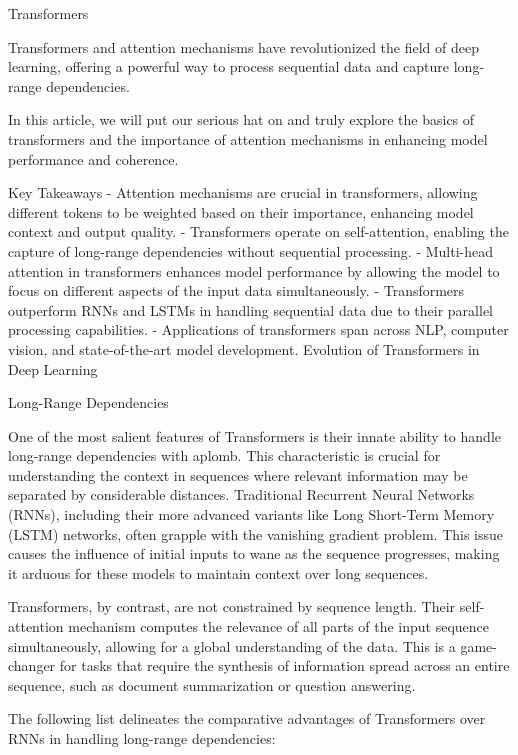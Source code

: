 \documentclass[10pt]{beamer}
\begin{document}
\begin{frame}[fragile]{Transformers}

	Transformers and attention mechanisms have revolutionized the field of deep learning, offering a powerful way to
	process sequential data and capture long-range dependencies.

	In this article, we will put our serious hat on and truly explore the basics of transformers and the importance of
	attention mechanisms in enhancing model performance and coherence.

	Key Takeaways
	- Attention mechanisms are crucial in transformers, allowing different tokens to be weighted based on their
	importance, enhancing model context and output quality.
	- Transformers operate on self-attention, enabling the capture of long-range dependencies without sequential
	processing.
	- Multi-head attention in transformers enhances model performance by allowing the model to focus on different
	aspects of the input data simultaneously.
	- Transformers outperform RNNs and LSTMs in handling sequential data due to their parallel processing
	capabilities.
	- Applications of transformers span across NLP, computer vision, and state-of-the-art model development.
	Evolution of Transformers in Deep Learning

	Long-Range Dependencies

	One of the most salient features of Transformers is their innate ability to handle long-range dependencies with
	aplomb. This characteristic is crucial for understanding the context in sequences where relevant information may be
	separated by considerable distances. Traditional Recurrent Neural Networks (RNNs), including their more advanced
	variants like Long Short-Term Memory (LSTM) networks, often grapple with the vanishing gradient problem. This issue
	causes the influence of initial inputs to wane as the sequence progresses, making it arduous for these models to
	maintain context over long sequences.

	Transformers, by contrast, are not constrained by sequence length. Their self-attention mechanism computes the
	relevance of all parts of the input sequence simultaneously, allowing for a global understanding of the data. This
	is a game-changer for tasks that require the synthesis of information spread across an entire sequence, such as
	document summarization or question answering.

	The following list delineates the comparative advantages of Transformers over RNNs in handling long-range
	dependencies:


\end{frame}
\end{document}
